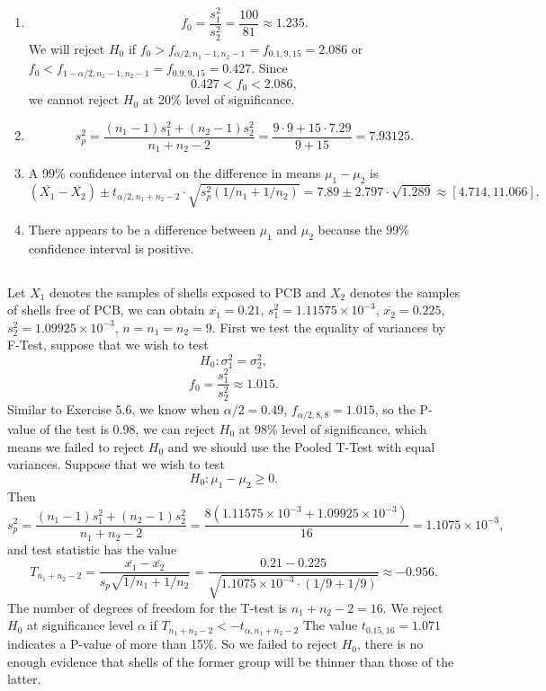 \documentclass[11pt,a4paper]{article}
\begin{document}
\subsection{}
\begin{enumerate}[label=\roman*)]
\item
$$f_0=\frac{s_1^2}{s_2^2}=\frac{100}{81}\approx1.235.$$
We will reject $H_0$ if $f_0>f_{\alpha/2,n_1-1,n_2-1}=f_{0.1,9,15}=2.086$ or $f_0<f_{1-\alpha/2,n_1-1,n_2-1}=f_{0.9,9,15}=0.427$. Since 
$$0.427<f_0<2.086,$$ 
we cannot reject $H_0$ at 20\% level of significance.
\item
$$s_p^2=\frac{(n_1-1)s_1^2+(n_2-1)s_2^2}{n_1+n_2-2}=\frac{9\cdot9+15\cdot7.29}{9+15}=7.93125.$$
\item
A 99\% confidence interval on the difference in means $\mu_1-\mu_2$ is
$$(\overline{X_1}-\overline{X_2})\pm t_{\alpha/2,n_1+n_2-2}\cdot\sqrt{s_p^2(1/n_1+1/n_2)}=7.89\pm2.797\cdot\sqrt{1.289}\approx[4.714,11.066].$$
\item
There appears to be a difference between $\mu_1$ and $\mu_2$ because the 99\% confidence interval is positive.
\end{enumerate}

\subsection{}
Let $X_1$ denotes the samples of shells exposed to PCB and $X_2$ denotes the samples of shells free of PCB, we can obtain $\overline{x_1}=0.21$, $s_1^2=1.11575\times10^{-3}$, $\overline{x_2}=0.225$, $s_2^2=1.09925\times10^{-3}$, $n=n_1=n_2=9$.
First we test the equality of variances by F-Test, suppose that we wish to test
$$H_0:\sigma_1^2=\sigma_2^2,$$
$$f_0=\frac{s_1^2}{s_2^2}\approx1.015.$$
Similar to Exercise 5.6, we know when $\alpha/2=0.49$, $f_{\alpha/2,8,8}=1.015$, so the P-value of the test is 0.98, we can reject $H_0$ at 98\% level of significance, which means we failed to reject $H_0$ and we should use the Pooled T-Test with equal variances. Suppose that we wish to test
$$H_0:\mu_1-\mu_2\geqslant 0.$$
Then
$$s_p^2=\frac{(n_1-1)s_1^2+(n_2-1)s_2^2}{n_1+n_2-2}=\frac{8(1.11575\times10^{-3}+1.09925\times10^{-3})}{16}=1.1075\times10^{-3},$$
and test statistic has the value
$$T_{n_1+n_2-2}=\frac{\overline{x_1}-\overline{x_2}}{s_p\sqrt{1/n_1+1/n_2}}=\frac{0.21-0.225}{\sqrt{1.1075\times10^{-3}\cdot(1/9+1/9)}}\approx-0.956.$$
The number of degrees of freedom for the T-test is
$n_1+n_2-2=16$. We reject $H_0$ at significance level $\alpha$ if $T_{n_1+n_2-2}<-t_{\alpha,n_1+n_2-2}$ The value $t_{0.15,16}=1.071$ indicates a P-value of more than 15\%. So we failed to reject $H_0$, there is no enough evidence that shells of the former group will be thinner than those of the latter.
\end{document}
